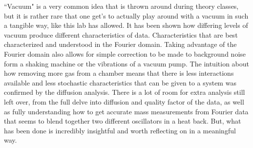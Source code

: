 \documentclass[12pt]{article}
\begin{document}
``Vacuum" is a very common idea that is thrown around during theory classes, but it is rather rare that one get's to actually play around with a vacuum in such a tangible way, like this lab has allowed. It has been shown how differing levels of vacuum produce different characteristics of data. Characteristics that are best characterized and understood in the Fourier domain. Taking advantage of the Fourier domain also allows for simple correction to be made to background noise form a shaking machine or the vibrations of a vacuum pump. The intuition about how removing more gas from a chamber means that there is less interactions available and less stochastic characteristics that can be given to a system was confirmed by the diffusion analysis. There is a lot of room for extra analysis still left over, from the full delve into diffusion and quality factor of the data, as well as fully understanding how to get accurate mass measurements from Fourier data that seems to blend together two different oscillators in a heat back. But, what has been done is incredibly insightful and worth reflecting on in a meaningful way.
\end{document}

